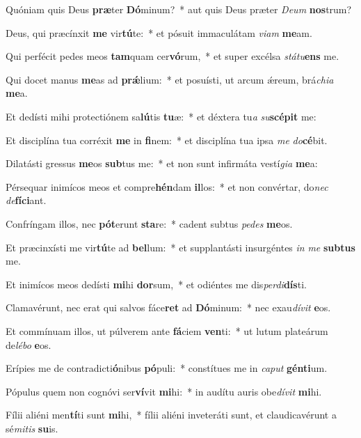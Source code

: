 \item Quóniam quis Deus \textbf{præ}ter \textbf{Dó}minum?~* aut quis Deus præter \textit{De}\textit{um} \textbf{nos}trum?
\item Deus, qui præcínxit \textbf{me} vir\textbf{tú}te:~* et pósuit immaculátam \textit{vi}\textit{am} \textbf{me}am.
\item Qui perfécit pedes meos \textbf{tam}quam cer\textbf{vó}rum,~* et super excélsa \textit{stá}\textit{tu}\textbf{ens} me.
\item Qui docet manus \textbf{me}as ad \textbf{prǽ}lium:~* et posuísti, ut arcum ǽreum, brá\textit{chi}\textit{a} \textbf{me}a.
\item Et dedísti mihi protectiónem sa\textbf{lú}tis \textbf{tu}æ:~* et déxtera tu\textit{a} \textit{su}\textbf{scé}\textbf{pit} me:
\item Et disciplína tua corréxit \textbf{me} in \textbf{fi}nem:~* et disciplína tua ipsa \textit{me} \textit{do}\textbf{cé}bit.
\item Dilatásti gressus \textbf{me}os \textbf{sub}tus me:~* et non sunt infirmáta vestí\textit{gi}\textit{a} \textbf{me}a:
\item Pérsequar inimícos meos et compre\textbf{hén}dam \textbf{il}los:~* et non convértar, do\textit{nec} \textit{de}\textbf{fí}\textbf{ci}ant.
\item Confríngam illos, nec \textbf{pót}erunt \textbf{sta}re:~* cadent subtus \textit{pe}\textit{des} \textbf{me}os.
\item Et præcinxísti me vir\textbf{tú}te ad \textbf{bel}lum:~* et supplantásti insurgéntes \textit{in} \textit{me} \textbf{sub}\textbf{tus} me.
\item Et inimícos meos dedísti \textbf{mi}hi \textbf{dor}sum,~* et odiéntes me dis\textit{per}\textit{di}\textbf{dís}ti.
\item Clamavérunt, nec erat qui salvos fáce\textbf{ret} ad \textbf{Dó}minum:~* nec exau\textit{dí}\textit{vit} \textbf{e}os.
\item Et commínuam illos, ut púlverem ante \textbf{fá}ciem \textbf{ven}ti:~* ut lutum plateárum de\textit{lé}\textit{bo} \textbf{e}os.
\item Erípies me de contradicti\textbf{ó}nibus \textbf{pó}puli:~* constítues me in \textit{ca}\textit{put} \textbf{gén}\textbf{ti}um.
\item Pópulus quem non cognóvi ser\textbf{ví}vit \textbf{mi}hi:~* in audítu auris obe\textit{dí}\textit{vit} \textbf{mi}hi.
\item Fílii aliéni men\textbf{tí}ti sunt \textbf{mi}hi,~* fílii aliéni inveteráti sunt, et claudicavérunt a sé\textit{mi}\textit{tis} \textbf{su}is.
